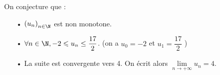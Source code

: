 \vspace*{.5cm}

On conjecture que  :
\begin{itemize}
\item[•] $\left(u_n\right)_{n \in \N}$ est non monotone.
\item[•] $\forall n \in \N, -2 \leqslant u_n \leq \dfrac{17}{2}$. (on a $u_0 = -2$ et $u_1 = \dfrac{17}{2}$ )
\item[•] La suite est convergente vers 4. On écrit alors $\lim\limits_{n \to +\infty} u_n = 4$. 
\end{itemize}


\ifdefined\COMPLETE
\else
    
\fi